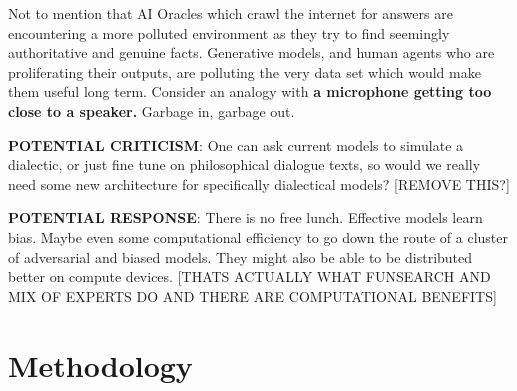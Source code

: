 \documentclass[11pt, oneside]{article}   	%
\begin{document}
Not to mention that AI Oracles which crawl the internet for answers are encountering a more polluted environment as they try to find seemingly authoritative and genuine facts.  Generative models, and human agents who are proliferating their outputs, are polluting the very data set which would make them useful long term.  Consider an analogy with \textbf{a microphone getting too close to a speaker.}  Garbage in, garbage out.



\textbf{POTENTIAL CRITICISM}: One can ask current models to simulate a dialectic, or just fine tune on philosophical dialogue texts, so would we really need some new architecture for specifically dialectical models? [REMOVE THIS?]

\textbf{POTENTIAL RESPONSE}: There is no free lunch.  \cite{Wolpertetal1997}  Effective models learn bias.  \cite{Mitchell1980}  Maybe even some computational efficiency to go down the route of a cluster of adversarial and biased models. They might also be able to be distributed better on compute devices. [THATS ACTUALLY WHAT FUNSEARCH AND MIX OF EXPERTS DO AND THERE ARE COMPUTATIONAL BENEFITS]





\section{Methodology}
\end{document}
